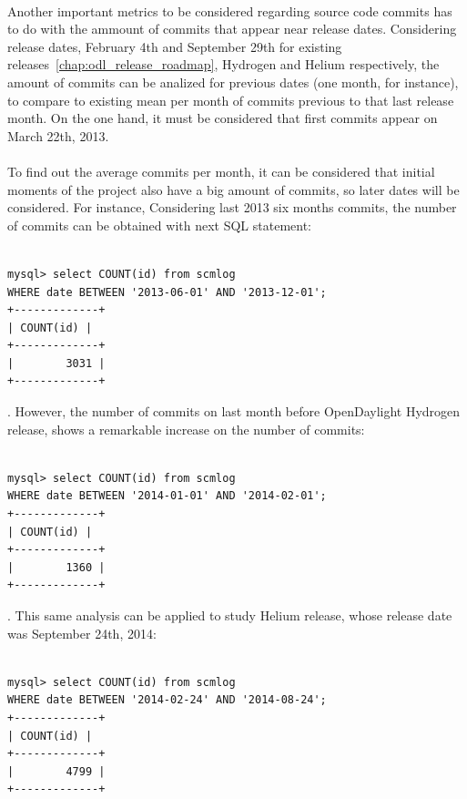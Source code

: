 \documentclass[a4paper, 12pt]{book}
\begin{document}
\\
Another important metrics to be considered regarding source code commits has to do with the ammount of commits that appear near release dates. Considering release dates, February 4th and September 29th for existing releases~\ref{chap:odl_release_roadmap}, Hydrogen and Helium respectively, the amount of commits can be analized for previous dates (one month, for instance), to compare to existing mean per month of commits previous to that last release month. On the one hand, it must be considered that first commits appear on March 22th, 2013.\\
\\
To find out the average commits per month, it can be considered that initial moments of the project also have a big amount of commits, so later dates will be considered. For instance, Considering last 2013 six months commits, the number of commits can be obtained with next SQL statement:

\begin{verbatim}

mysql> select COUNT(id) from scmlog 
WHERE date BETWEEN '2013-06-01' AND '2013-12-01';
+-------------+
| COUNT(id) |
+-------------+
|        3031 |
+-------------+

\end{verbatim}

. However, the number of commits on last month before OpenDaylight Hydrogen release, shows a remarkable increase on the number of commits:

\begin{verbatim}

mysql> select COUNT(id) from scmlog
WHERE date BETWEEN '2014-01-01' AND '2014-02-01';
+-------------+
| COUNT(id) |
+-------------+
|        1360 |
+-------------+

\end{verbatim}
. This same analysis can be applied to study Helium release, whose release date was September 24th, 2014:

\begin{verbatim}

mysql> select COUNT(id) from scmlog 
WHERE date BETWEEN '2014-02-24' AND '2014-08-24';
+-------------+
| COUNT(id) |
+-------------+
|        4799 |
+-------------+

\end{verbatim}
\end{document}
